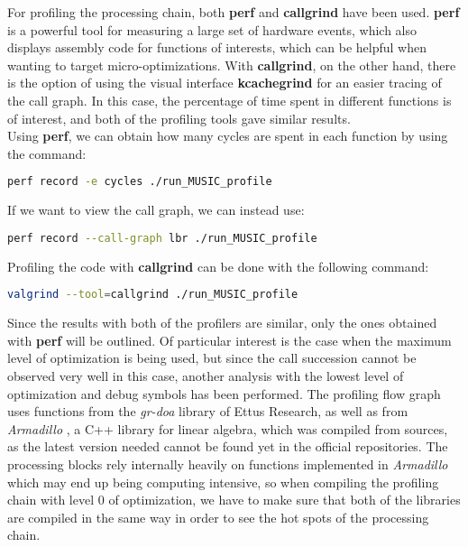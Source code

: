 For profiling the processing chain, both \textbf{perf} \cite{cite:perf} and
\textbf{callgrind} \cite{cite:callgrind} have been used. \textbf{perf} is a
powerful tool for measuring a large set of hardware events, which also displays
assembly code for functions of interests, which can be helpful when wanting to
target micro-optimizations.  With \textbf{callgrind}, on the other hand, there
is the option of using the visual interface \textbf{kcachegrind}
\cite{cite:kcachegrind} for an easier tracing of the call graph. In this case,
the percentage of time spent in different functions is of interest, and both of
the profiling tools gave similar results. \\

Using \textbf{perf}, we can obtain how many cycles are spent in each function by using
the command:
\begin{lstlisting}[language=bash]
perf record -e cycles ./run_MUSIC_profile
\end{lstlisting}

If we want to view the call graph, we can instead use:
\begin{lstlisting}[language=bash]
perf record --call-graph lbr ./run_MUSIC_profile
\end{lstlisting}

Profiling the code with \textbf{callgrind} can be done with the following
command:
\begin{lstlisting}[language=bash]
valgrind --tool=callgrind ./run_MUSIC_profile
\end{lstlisting}

Since the results with both of the profilers are similar, only the ones obtained
with \textbf{perf} will be outlined. Of particular interest is the case when the
maximum level of optimization is being used, but since the call succession
cannot be observed very well in this case, another analysis with the lowest
level of optimization and debug symbols has been performed. The profiling flow
graph uses functions from the \textit{gr-doa} library of Ettus Research, as well
as from \textit{Armadillo} \cite{cite:armadillo}, a C++ library for linear
algebra, which was compiled from sources, as the latest version needed cannot be
found yet in the official repositories. The processing blocks rely internally
heavily on functions implemented in \textit{Armadillo} which may end up being
computing intensive, so when compiling the profiling chain with level 0 of
optimization, we have to make sure that both of the libraries are compiled in
the same way in order to see the hot spots of the processing chain.

